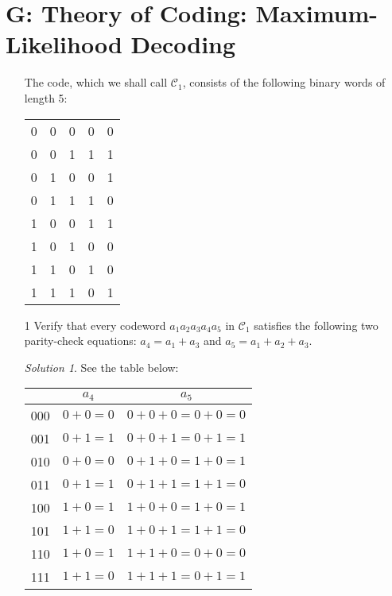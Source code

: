 \documentclass[11pt, b5paper, draft, fleqn]{book}
\theoremstyle{remark}
\newtheorem*{solution}{Solution}
\theoremstyle{plain}
\begin{document}
\section*{G: Theory of Coding: Maximum-Likelihood Decoding}
\begin{enumerate}
	\item[] The code, which we shall call \(\mathcal{C}_1\), consists of the following binary words of length 5: \\
	\begin{center}
	\begin{tabular}{ c c c c c}
		0 & 0 & 0 & 0 & 0 \\
		0 & 0 & 1 & 1 & 1 \\
		0 & 1 & 0 & 0 & 1 \\
		0 & 1 & 1 & 1 & 0 \\
		1 & 0 & 0 & 1 & 1 \\
		1 & 0 & 1 & 0 & 0 \\
		1 & 1 & 0 & 1 & 0 \\
		1 & 1 & 1 & 0 & 1
	\end{tabular}
	\end{center}
	
	\item[1] Verify that every codeword \(a_1 a_2 a_3 a_4 a_5\) in \(\mathcal{C}_1\) satisfies the following two parity-check equations: \(a_4 = a_1 + a_3\) and \(a_5 = a_1 + a_2 + a_3\).
	\begin{solution}
		See the table below:
		\begin{center}
		\begin{tabular}{ c | c c}
			& \(a_4\) & \(a_5\) \\
			\hline
			000 & \(0 + 0 = 0\) & \(0 + 0 + 0 = 0 + 0 = 0\) \\
			001 & \(0 + 1 = 1\) & \(0 + 0 + 1 = 0 + 1 = 1\) \\
			010 & \(0 + 0 = 0\) & \(0 + 1 + 0 = 1 + 0 = 1\) \\
			011 & \(0 + 1 = 1\) & \(0 + 1 + 1 = 1 + 1 = 0\) \\
			100 & \(1 + 0 = 1\) & \(1 + 0 + 0 = 1 + 0 = 1\) \\
			101 & \(1 + 1 = 0\) & \(1 + 0 + 1 = 1 + 1 = 0\) \\
			110 & \(1 + 0 = 1\) & \(1 + 1 + 0 = 0 + 0 = 0\) \\
			111 & \(1 + 1 = 0\) & \(1 + 1 + 1 = 0 + 1 = 1\)
		\end{tabular}
		\end{center}
	\end{solution}
	

\end{enumerate}
\end{document}
